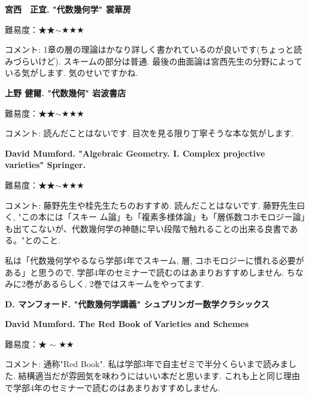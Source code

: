\textbf{宮西　正宜. "代数幾何学" 裳華房}  \vspace{-6pt}

難易度：★★$\sim$★★★  \vspace{-6pt}
 
コメント: 1章の層の理論はかなり詳しく書かれているのが良いです(ちょっと読みづらいけど). スキームの部分は普通. 最後の曲面論は宮西先生の分野によっている気がします. 気のせいですかね. 
\vspace{8pt}

\textbf{上野 健爾. "代数幾何" 岩波書店}\vspace{-6pt}

難易度：★★$\sim$★★★  \vspace{-6pt}

コメント:  読んだことはないです. 目次を見る限り丁寧そうな本な気がします.  
\vspace{8pt}

\textbf{David Mumford. "Algebraic Geometry. I. Complex projective varieties" Springer.}\vspace{-6pt}

難易度：★★$\sim$★★★  \vspace{-6pt}

コメント:  藤野先生や桂先生たちのおすすめ.  読んだことはないです. 藤野先生曰く, "この本には「スキー
ム論」も「複素多様体論」も「層係数コホモロジー論」も出てこないが、代数幾何学の神髄に早い段階で触れることの出来る良書である。"とのこと. 

私は「代数幾何学やるなら学部4年でスキーム, 層, コホモロジーに慣れる必要がある」と思うので, 学部4年のセミナーで読むのはあまりおすすめしません. ちなみに2巻があるらしく, 2巻ではスキームをやってます. 
\vspace{8pt}

\textbf{D. マンフォード. "代数幾何学講義" シュプリンガー数学クラシックス}\vspace{-6pt}

\textbf{David Mumford. The Red Book of Varieties and Schemes}\vspace{-6pt}

難易度：★ $\sim$ ★★ \vspace{-6pt}

コメント:  通称"Red Book". 私は学部3年で自主ゼミで半分くらいまで読みました. 結構適当だが雰囲気を味わうにはいい本だと思います. これも上と同じ理由で学部4年のセミナーで読むのはあまりおすすめしません. 
\vspace{8pt}


